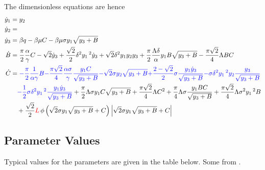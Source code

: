The dimensionless equations are hence
~
\begin{equation}
\begin{split}
    \dot{y}_1 &= y_2 \\
    \dot{y}_2 &= \\
    \dot{y}_3 &= \beta q - \beta \mu C - \beta \mu \sigma y_1 \sqrt{y_3 + B} \\
    \dot{B} &= \frac{\pi}{2} \frac{\alpha}{\gamma} C - \sqrt{2} \dot{y}_3 + \frac{\sqrt{2}}{2} \delta^2 y_1\,^2 \dot{y}_3 + \sqrt{2} \delta^2 y_1 y_2 y_3 + \frac{\pi}{2} \frac{\Lambda \delta}{\alpha} y_1 B \sqrt{y_3 + B} - \frac{\pi \sqrt{2}}{4} \Lambda B C \\
    \dot{C} &=
    \textcolor{Blue}{- \frac{\pi}{2} \frac{1}{\alpha \gamma} B}
    \textcolor{Blue}{- \frac{\pi \sqrt{2}}{4} \frac{\alpha \sigma}{\gamma} \frac{y_1 C}{\sqrt{y_3 + B}} }
    \textcolor{Blue}{- \sqrt{2} \sigma y_2 \sqrt{y_3 + B} }
    \textcolor{Blue}{+ \frac{2-\sqrt{2}}{2} \sigma \frac{y_1 \dot{y}_3}{\sqrt{y_3 + B}} }
    \textcolor{Blue}{- \sigma \delta^2 y_1\,^2 y_2 \frac{y_3}{\sqrt{y_3 + B}} }
    \\ & \quad %
    \textcolor{Blue}{- \frac{1}{2} \sigma \delta^2 y_1\,^2 \frac{y_1 \dot{y}_3}{\sqrt{y_3 + B}} }
    + \frac{\pi}{2} \Lambda \sigma y_1 C \sqrt{y_3 + B}
    + \frac{\pi \sqrt{2}}{4} \Lambda C^2
    + \frac{\pi}{4} \Lambda \sigma \frac{y_1 B C}{\sqrt{y_3 + B}}
    + \frac{\pi \sqrt{2}}{4} \Lambda \sigma^2 y_1\,^2 B
    \\ & \quad %
    + \frac{\sqrt{2}}{2} \textcolor{Red}{L} \, \phi \left( \sqrt{2} \sigma y_1 \sqrt{y_3 + B} + C \right) \left| \sqrt{2} \sigma y_1 \sqrt{y_3 + B} + C \right|
\end{split}
\end{equation}

\newpage
\subsection{Parameter Values}

Typical values for the parameters are given in the table below. Some from \cite{Hos2016DynamicService}.

